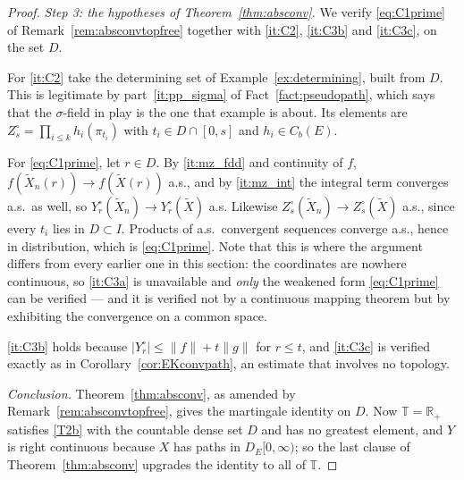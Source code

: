 \documentclass[11pt,a4paper]{article}
\theoremstyle{plain}
\theoremstyle{definition}
\theoremstyle{remark}
\newcommand{\R}{\mathbb{R}}
\newcommand{\Rp}{\R_+}
\newcommand{\T}{\mathbb{T}}                     %
\newcommand{\Cb}{C_b}                          %
\newcommand{\DE}{D_E[0,\infty)}
\begin{document}
\begin{proof}
  \emph{Step 3: the hypotheses of Theorem~\ref{thm:absconv}.}  We verify
  \eqref{eq:C1prime} of Remark~\ref{rem:absconvtopfree} together with
  \ref{it:C2}, \ref{it:C3b} and \ref{it:C3c}, on the set $D$.

  For \ref{it:C2} take the determining set of Example~\ref{ex:determining},
  built from $D$.  This is legitimate by part~\ref{it:pp_sigma} of
  Fact~\ref{fact:pseudopath}, which says that the $\sigma$-field in play is the
  one that example is about.  Its
  elements are $Z^\circ_s = \prod_{i \leq k} h_i(\pi_{t_i})$ with $t_i \in D \cap
  [0,s]$ and $h_i \in \Cb(E)$.

  For \eqref{eq:C1prime}, let $r \in D$.  By \ref{it:mz_fdd} and continuity of
  $f$, $f(\tilde X_n(r)) \to f(\tilde X(r))$ a.s., and by \ref{it:mz_int} the
  integral term converges a.s.\ as well, so $Y^\circ_r(\tilde X_n) \to
  Y^\circ_r(\tilde X)$ a.s.  Likewise $Z^\circ_s(\tilde X_n) \to Z^\circ_s(\tilde
  X)$ a.s., since every $t_i$ lies in $D \subset I$.  Products of a.s.\ convergent
  sequences converge a.s., hence in distribution, which is \eqref{eq:C1prime}.
  Note that this is where the argument differs from every earlier one in this
  section: the coordinates are nowhere continuous, so \ref{it:C3a} is unavailable
  and \emph{only} the weakened form \eqref{eq:C1prime} can be verified --- and it
  is verified not by a continuous mapping theorem but by exhibiting the
  convergence on a common space.

  \ref{it:C3b} holds because $|Y^\circ_r| \leq \lVert f \rVert + t \lVert g\rVert$
  for $r \leq t$, and \ref{it:C3c} is verified exactly as in
  Corollary~\ref{cor:EKconvpath}, an estimate that involves no topology.

  \emph{Conclusion.}  Theorem~\ref{thm:absconv}, as amended by
  Remark~\ref{rem:absconvtopfree}, gives the martingale identity on $D$.  Now $\T
  = \Rp$ satisfies \eqref{T2b} with the countable dense set $D$ and has no
  greatest element, and $Y$ is right continuous because $X$ has paths in $\DE$; so
  the last clause of Theorem~\ref{thm:absconv} upgrades the identity to all of
  $\T$.
\end{proof}
\end{document}
